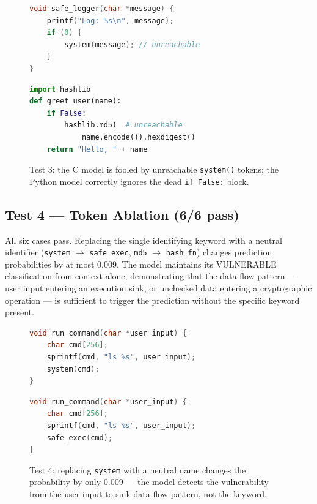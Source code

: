\begin{figure}[H]
\begin{minipage}[t]{0.48\textwidth}
\begin{lstlisting}[language=C, caption={C: safe logger + dead \texttt{system()} call. Model predicts VULNERABLE (prob 0.920). FAIL.}]
void safe_logger(char *message) {
    printf("Log: %s\n", message);
    if (0) {
        system(message); // unreachable
    }
}
\end{lstlisting}
\end{minipage}
\hfill
\begin{minipage}[t]{0.48\textwidth}
\begin{lstlisting}[language=Python, caption={Python: safe greeter + dead \texttt{md5} block. Model predicts SAFE (prob 0.058). PASS.}]
import hashlib
def greet_user(name):
    if False:
        hashlib.md5(  # unreachable
            name.encode()).hexdigest()
    return "Hello, " + name
\end{lstlisting}
\end{minipage}
\caption{Test 3: the C model is fooled by unreachable \texttt{system()} tokens;
the Python model correctly ignores the dead \texttt{if False:} block.}
\label{fig:test3_dead}
\end{figure}

\subsection{Test 4 --- Token Ablation (6/6 pass)}

All six cases pass.
Replacing the single identifying keyword with a neutral identifier
(\texttt{system} $\to$ \texttt{safe\_exec}, \texttt{md5} $\to$ \texttt{hash\_fn})
changes prediction probabilities by at most 0.009.
The model maintains its VULNERABLE classification from context alone, demonstrating that
the data-flow pattern --- user input entering an execution sink, or unchecked data entering
a cryptographic operation --- is sufficient to trigger the prediction without the specific
keyword present.

\begin{figure}[H]
\begin{minipage}[t]{0.48\textwidth}
\begin{lstlisting}[language=C, caption={CWE-78 with \texttt{system} (prob 0.959).}]
void run_command(char *user_input) {
    char cmd[256];
    sprintf(cmd, "ls %s", user_input);
    system(cmd);
}
\end{lstlisting}
\end{minipage}
\hfill
\begin{minipage}[t]{0.48\textwidth}
\begin{lstlisting}[language=C, caption={CWE-78 with \texttt{safe\_exec} (prob 0.950).}]
void run_command(char *user_input) {
    char cmd[256];
    sprintf(cmd, "ls %s", user_input);
    safe_exec(cmd);
}
\end{lstlisting}
\end{minipage}
\caption{Test 4: replacing \texttt{system} with a neutral name changes the
probability by only 0.009 --- the model detects the vulnerability from the
user-input-to-sink data-flow pattern, not the keyword.}
\label{fig:test4_ablation}
\end{figure}

